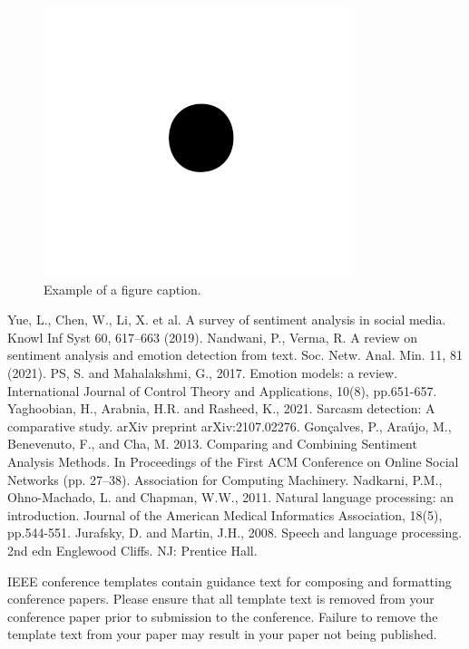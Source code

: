 \documentclass[conference]{IEEEtran}
\begin{document}
\begin{figure}[htbp]
\centerline{\includegraphics{fig1.png}}
\caption{Example of a figure caption.}
\label{fig}
\end{figure}
\newpage
\begin{thebibliography}{00}
 Yue, L., Chen, W., Li, X. et al. A survey of sentiment analysis in social media. Knowl Inf Syst 60, 617–663 (2019).
 Nandwani, P., Verma, R. A review on sentiment analysis and emotion detection from text. Soc. Netw. Anal. Min. 11, 81 (2021).
 PS, S. and Mahalakshmi, G., 2017. Emotion models: a review. International Journal of Control Theory and Applications, 10(8), pp.651-657.
 Yaghoobian, H., Arabnia, H.R. and Rasheed, K., 2021. Sarcasm detection: A comparative study. arXiv preprint arXiv:2107.02276.
 Gonçalves, P., Araújo, M., Benevenuto, F., and Cha, M. 2013. Comparing and Combining Sentiment Analysis Methods. In Proceedings of the First ACM Conference on Online Social Networks (pp. 27–38). Association for Computing Machinery.
 Nadkarni, P.M., Ohno-Machado, L. and Chapman, W.W., 2011. Natural language processing: an introduction. Journal of the American Medical Informatics Association, 18(5), pp.544-551.
 Jurafsky, D. and Martin, J.H., 2008. Speech and language processing. 2nd edn Englewood Cliffs. NJ: Prentice Hall.
\end{thebibliography}
\vspace{12pt}
\color{red}
IEEE conference templates contain guidance text for composing and formatting conference papers. Please ensure that all template text is removed from your conference paper prior to submission to the conference. Failure to remove the template text from your paper may result in your paper not being published.
\end{document}
